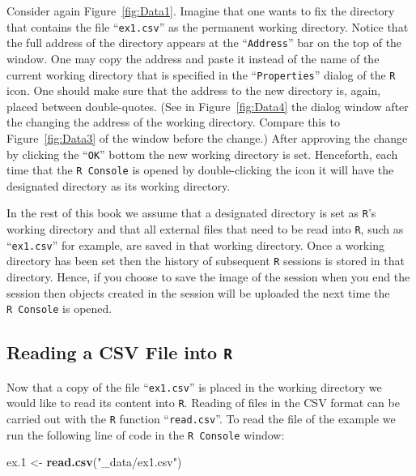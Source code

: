 \documentclass[]{krantz}
\makeatletter
\newenvironment{Shaded}{\begin{snugshade}}{\end{snugshade}}
\newcommand{\FloatTok}[1]{\textcolor[rgb]{0.00,0.00,0.81}{#1}}
\newcommand{\KeywordTok}[1]{\textcolor[rgb]{0.13,0.29,0.53}{\textbf{#1}}}
\newcommand{\NormalTok}[1]{#1}
\newcommand{\StringTok}[1]{\textcolor[rgb]{0.31,0.60,0.02}{#1}}
\newenvironment{kframe}{%
\medskip{}
\setlength{\fboxsep}{.8em}
 \def\at@end@of@kframe{}%
 \ifinner\ifhmode%
  \def\at@end@of@kframe{\end{minipage}}%
  \begin{minipage}{\columnwidth}%
 \fi\fi%
 \def\FrameCommand##1{\hskip\@totalleftmargin \hskip-\fboxsep
 \colorbox{shadecolor}{##1}\hskip-\fboxsep
     \hskip-\linewidth \hskip-\@totalleftmargin \hskip\columnwidth}%
 \MakeFramed {\advance\hsize-\width
   \@totalleftmargin\z@ \linewidth\hsize
   \@setminipage}}%
 {\par\unskip\endMakeFramed%
 \at@end@of@kframe}
\renewenvironment{Shaded}{\begin{kframe}}{\end{kframe}}
\theoremstyle{definition}
\theoremstyle{definition}
\theoremstyle{definition}
\theoremstyle{remark}
\makeatother
\begin{document}
Consider again Figure~\ref{fig:Data1}. Imagine that one wants to fix the
directory that contains the file ``\texttt{ex1.csv}'' as the permanent working
directory. Notice that the full address of the directory appears at the
``\texttt{Address}'' bar on the top of the window. One may copy the address and
paste it instead of the name of the current working directory that is
specified in the ``\texttt{Properties}'' dialog of the \texttt{R} icon. One should make
sure that the address to the new directory is, again, placed between
double-quotes. (See in Figure~\ref{fig:Data4} the dialog window after
the changing the address of the working directory. Compare this to
Figure~\ref{fig:Data3} of the window before the change.) After approving
the change by clicking the ``\texttt{OK}'' bottom the new working directory is
set. Henceforth, each time that the \texttt{R\ Console} is opened by
double-clicking the icon it will have the designated directory as its
working directory.

In the rest of this book we assume that a designated directory is set as
\texttt{R}'s working directory and that all external files that need to be read
into \texttt{R}, such as ``\texttt{ex1.csv}'' for example, are saved in that working
directory. Once a working directory has been set then the history of
subsequent \texttt{R} sessions is stored in that directory. Hence, if you
choose to save the image of the session when you end the session then
objects created in the session will be uploaded the next time the
\texttt{R\ Console} is opened.

\hypertarget{Data_3}{%
\subsection{\texorpdfstring{Reading a CSV File into \texttt{R}}{Reading a CSV File into R}}\label{Data_3}}

Now that a copy of the file ``\texttt{ex1.csv}'' is placed in the working
directory we would like to read its content into \texttt{R}. Reading of files
in the CSV format can be carried out with the \texttt{R} function ``\texttt{read.csv}''.
To read the file of the example we run the following line of code in the
\texttt{R\ Console} window:

\begin{Shaded}
\begin{Highlighting}[]
\NormalTok{ex}\FloatTok{.1}\NormalTok{ <-}\StringTok{ }\KeywordTok{read.csv}\NormalTok{(}\StringTok{"_data/ex1.csv"}\NormalTok{)}
\end{Highlighting}
\end{Shaded}
\end{document}
